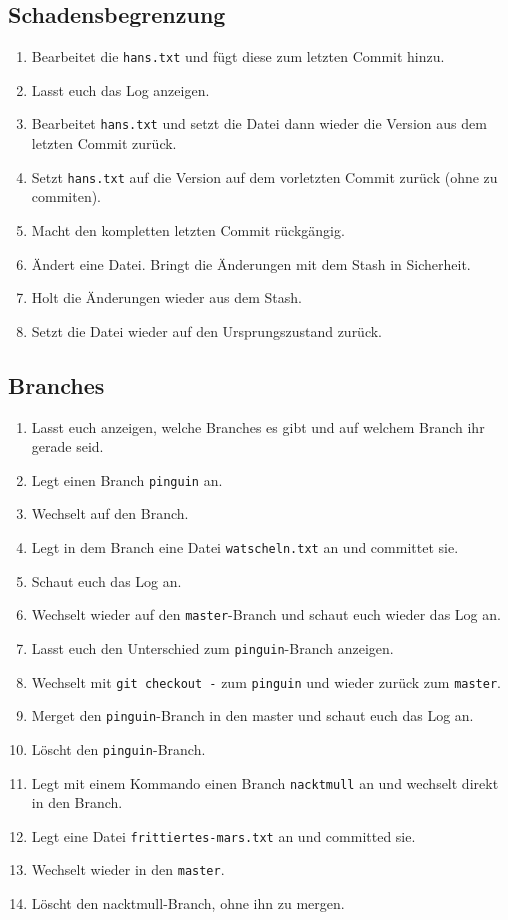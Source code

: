 \documentclass[a4paper,12pt]{scrartcl}
\begin{document}
\subsection{Schadensbegrenzung}
\begin{enumerate}
  \item Bearbeitet die \texttt{hans.txt} und fügt diese zum letzten Commit hinzu.  
  \item Lasst euch das Log anzeigen.
  \item Bearbeitet \texttt{hans.txt} und setzt die Datei dann wieder die Version aus dem letzten Commit zurück.
  \item Setzt \texttt{hans.txt} auf die Version auf dem vorletzten Commit zurück (ohne zu commiten).
  \item Macht den kompletten letzten Commit rückgängig.
  \item Ändert eine Datei. Bringt die Änderungen mit dem Stash in Sicherheit.
  \item Holt die Änderungen wieder aus dem Stash.
  \item Setzt die Datei wieder auf den Ursprungszustand zurück.
\end{enumerate}

\subsection{Branches}
\begin{enumerate}
  \item Lasst euch anzeigen, welche Branches es gibt und auf welchem Branch ihr gerade seid.
  \item Legt einen Branch \texttt{pinguin} an.
  \item Wechselt auf den Branch.
  \item Legt in dem Branch eine Datei \texttt{watscheln.txt} an und committet sie.
  \item Schaut euch das Log an.
  \item Wechselt wieder auf den \texttt{master}-Branch und schaut euch wieder das Log an.
  \item Lasst euch den Unterschied zum \texttt{pinguin}-Branch anzeigen.
  \item Wechselt mit \texttt{git checkout -} zum \texttt{pinguin} und wieder zurück zum \texttt{master}.
  \item Merget den \texttt{pinguin}-Branch in den master und schaut euch das Log an.
  \item Löscht den \texttt{pinguin}-Branch.
  \item Legt mit einem Kommando einen Branch \texttt{nacktmull} an und wechselt direkt in den Branch.
  \item Legt eine Datei \texttt{frittiertes-mars.txt} an und committed sie.
  \item Wechselt wieder in den \texttt{master}.
  \item Löscht den {nacktmull}-Branch, ohne ihn zu mergen.
\end{enumerate}
\end{document}
